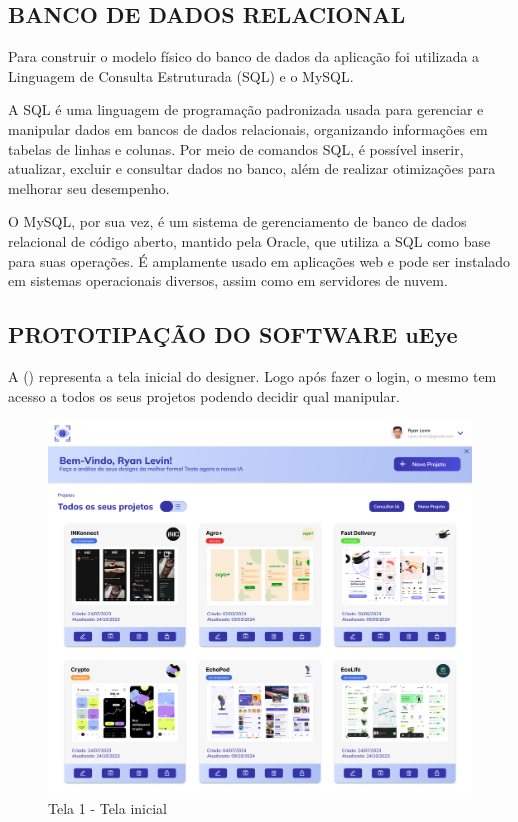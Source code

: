 \subsection*{BANCO DE DADOS RELACIONAL}
Para construir o modelo físico do banco de dados da aplicação foi utilizada a Linguagem de Consulta Estruturada (SQL) e o MySQL.

A SQL é uma linguagem de programação padronizada usada para gerenciar e manipular dados em bancos de dados relacionais, organizando informações em tabelas de linhas e colunas. Por meio de comandos SQL, é possível inserir, atualizar, excluir e consultar dados no banco, além de realizar otimizações para melhorar seu desempenho.

O MySQL, por sua vez, é um sistema de gerenciamento de banco de dados relacional de código aberto, mantido pela Oracle, que utiliza a SQL como base para suas operações. É amplamente usado em aplicações web e pode ser instalado em sistemas operacionais diversos, assim como em servidores de nuvem. \textcite{Amazon}\newline

\subsection*{PROTOTIPAÇÃO DO SOFTWARE uEye}
A () representa a tela inicial do designer. Logo após fazer o login, o mesmo tem acesso a todos os seus projetos podendo decidir qual manipular.

\begin{figure}[H]
    \centering
    \caption{Tela 1 - Tela inicial}%
    \label{fig:pg-tela1}
    \includegraphics[width=0.72\linewidth]{Illustrations/tela1.png}
\end{figure}

